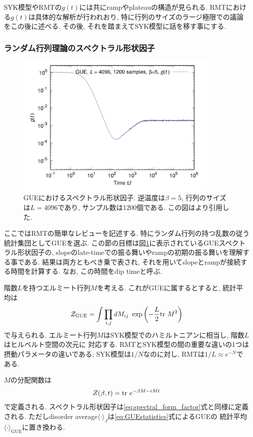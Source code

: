 SYK模型やRMTの$g(t)$には共にrampやplateauの構造が見られる. 
RMTにおける$g(t)$は具体的な解析が行われおり, 特に行列のサイズのラージ極限での議論をこの後に述べる. 
その後, それを踏まえてSYK模型に話を移す事にする. 

\subsubsection{ランダム行列理論のスペクトラル形状因子}
\begin{figure}[ht]
	\centering
	\includegraphics[width=10cm]{figures/spectralformfactor_inRMT}
	\caption{GUEにおけるスペクトラル形状因子. 逆温度は$\beta=5$, 行列のサイズは$L=4096$であり, 
		サンプル数は1200個である. この図は\cite{polchinski_chaos}より引用した. 
	}
	\label{fig:spectralformfactor_inRMT}
\end{figure}
ここではRMTの簡単なレビューを記述する. 
特にランダム行列の持つ乱数の従う統計集団としてGUEを選ぶ. 
この節の目標は図\ref{fig:spectralformfactor_inRMT}に表示されているGUEスペクトラル形状因子の, 
slopeのlate-timeでの振る舞いやrampの初期の振る舞いを理解する事である. 
結果は両方ともべき乗で表され, それを用いてslopeとrampが接続する時間を計算する. 
なお, この時間をdip timeと呼ぶ. 

階数$L$を持つエルミート行列$M$を考える. 
これがGUEに属するとすると, 統計平均は
\begin{align}
	\mathcal{Z}_{\mathrm{GUE}} = \int \prod_{i, j} dM_{ij}\ \exp\left(
		-\frac{L}{2}\mathrm{tr}\ M^2
	\right)
	\label{eq:GUEstatistics}
\end{align}
で与えられる. 
エルミート行列$M$はSYK模型でのハミルトニアンに相当し, 階数$L$はヒルベルト空間の次元に
対応する. 
RMTとSYK模型の間の重要な違いの1つは摂動パラメータの違いである; SYK模型は$1/N$なのに対し, 
RMTは$1/L \approx e^{-N}$である. 

$M$の分配関数は
\begin{align}
	Z(\beta, t) = \mathrm{tr}\ e^{-\beta M - iMt}
	\label{eq:GUEpartition_function}
\end{align}
で定義される. 
スペクトラル形状因子は\eqref{eq:spectral_form_factor}式と同様に定義される. 
ただしdisorder average$\langle \cdot\rangle_J$は\eqref{eq:GUEstatistics}式によるGUEの
統計平均$\langle\cdot\rangle_{\mathrm{GUE}}$に置き換わる. 


